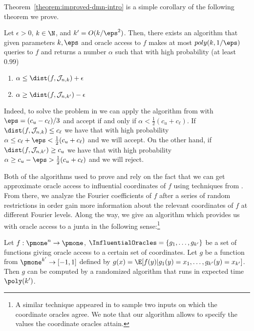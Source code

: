 Theorem~\ref{theorem:improved-dmn-intro} is a simple corollary of the following theorem we prove.

\begin{theorem}\label{theorem:improved-dmn}
Let $\epsilon>0$, $k \in \N$, and $k' = O(k/\eps^2)$. Then, there exists an algorithm that given parameters $k, \eps$ and oracle access to $f$ makes at most $poly(k, 1 / \eps)$ queries to $f$ and returns a number $\alpha$ such that with high probability (at least $0.99$) 
%
\begin{enumerate}
	\item $\alpha \le \dist(f,\mathcal{J}_{n,k})+\epsilon$
	\item $\alpha \ge \dist(f,\mathcal{J}_{n,k'})-\epsilon$
\end{enumerate}
\end{theorem}
Indeed, to solve the problem in  we can apply the algorithm from  with $\eps = (c_{u}-c_{\ell})/3$ and accept if and only if $\alpha < \frac{1}{2} (c_{u} + c_{\ell})$. If $\dist(f,\mathcal{J}_{n,k}) \le c_{\ell}$ we have that with high probability $\alpha \le c_{\ell} + \eps < \frac{1}{2} (c_{u} + c_{\ell})$ and we will accept.
On the other hand, 
if $\dist(f,\mathcal{J}_{n,k'}) \ge c_{u}$ we have that with high probability $\alpha \ge c_{u} - \eps > \frac{1}{2} (c_{u} + c_{\ell})$ and we will reject.


Both of the algorithms used to prove  and  rely on the fact that we can get approximate oracle access to influential coordinates of $f$ using techniques from \cite{junta-coordinate-oracles}. From there, we analyze the Fourier coefficients of $f$ after a series of random restrictions in order gain more information about the relevant coordinates of $f$ at different Fourier levels. 
Along the way, we give an algorithm which provides us with oracle access to a junta in the following sense:\footnote{A similar technique appeared in \cite[Section 5.1]{junta-coordinate-oracles} to sample two inputs on which the coordinate oracles agree. We note that our algorithm allows to specify the values the coordinate oracles attain.}
\begin{theorem}[Informal]
\label{theorem:implicit-junta-access-informal}
	Let $f: \pmone^n \to \pmone$, $\InfluentialOracles = \{g_1, \ldots, g_{k'}\}$ be a set of functions giving oracle access to a certain set of coordinates.
	Let $g$ be a function from $\pmone^{k'} \to [-1,1]$ defined by $g(x) = \E[f(y) | g_1(y)=x_1, \ldots, g_{k'}(y)=x_{k'}]$. Then $g$ can be computed by a randomized algorithm  that runs in expected time $\poly(k')$. 
\end{theorem}

